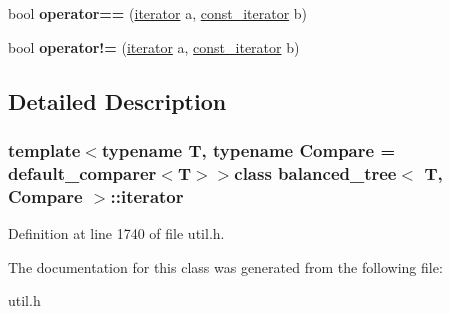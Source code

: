 \begin{DoxyCompactItemize}
\item 
\hypertarget{classbalanced__tree_1_1iterator_a9f5e8b44f23ba42f08c2e6aef8b15f87}{bool {\bfseries operator==} (\hyperlink{classbalanced__tree_1_1iterator}{iterator} a, \hyperlink{classbalanced__tree_1_1const__iterator}{const\+\_\+iterator} b)}\label{classbalanced__tree_1_1iterator_a9f5e8b44f23ba42f08c2e6aef8b15f87}

\item 
\hypertarget{classbalanced__tree_1_1iterator_a15414e5c388ab5c6b5ff2223c465af52}{bool {\bfseries operator!=} (\hyperlink{classbalanced__tree_1_1iterator}{iterator} a, \hyperlink{classbalanced__tree_1_1const__iterator}{const\+\_\+iterator} b)}\label{classbalanced__tree_1_1iterator_a15414e5c388ab5c6b5ff2223c465af52}

\end{DoxyCompactItemize}


\subsection{Detailed Description}
\subsubsection*{template$<$typename T, typename Compare = default\+\_\+comparer$<$\+T$>$$>$class balanced\+\_\+tree$<$ T, Compare $>$\+::iterator}



Definition at line 1740 of file util.\+h.



The documentation for this class was generated from the following file\+:\begin{DoxyCompactItemize}
\item 
util.\+h\end{DoxyCompactItemize}
